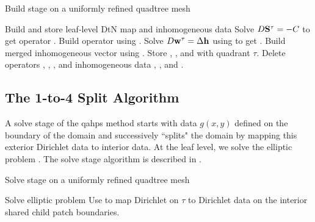 \begin{algorithm}[H]
    \caption{Build stage on a uniformly refined quadtree mesh}
    \begin{algorithmic}[0]
         
                \State Build and store leaf-level DtN map \Ttau and inhomogeneous data \htau
            \Else {}
                \State Solve $D\mathbf S^{\tau} = -C$ to get operator \Stau. 
                \State Build operator \Ttau using .
                \State Solve $D\mathbf w^{\tau} = \Delta \mathbf h$ using to get \wtau.  
                \State Build merged inhomogeneous vector \htau using .
                \State Store \Stau, \Ttau, \htau and \wtau with quadrant $\tau$.
                \State Delete operators \Talpha, \Tbeta, \Tgamma, \Tomega and inhomogeneous data \halpha, \hbeta, \hgamma and \homega.
            \EndIf
        \EndFor
    \end{algorithmic}
    \label{alg:build_merge_uniform}
\end{algorithm}

\subsection{The 1-to-4 Split Algorithm}
\label{sub:1-to-2-split-algorithm}

A solve stage of the \gls{qahps} method starts with data $g(x,y)$ defined on the boundary of the domain and successively ``splits" the domain by mapping this exterior Dirichlet data to interior data.  At the leaf level, we solve the elliptic problem . The solve stage algorithm is described in .
\begin{algorithm}[H]
    \caption{Solve stage on a uniformly refined quadtree mesh}
    \begin{algorithmic}[0]
         
                \State Solve elliptic problem 
            \Else{} 
                \State Use  to map Dirichlet \gext on $\tau$ to Dirichlet data \gint on the interior shared child patch boundaries.
            \EndIf
        \EndFor
    \end{algorithmic}
    \label{alg:solve_uniform}
\end{algorithm}

